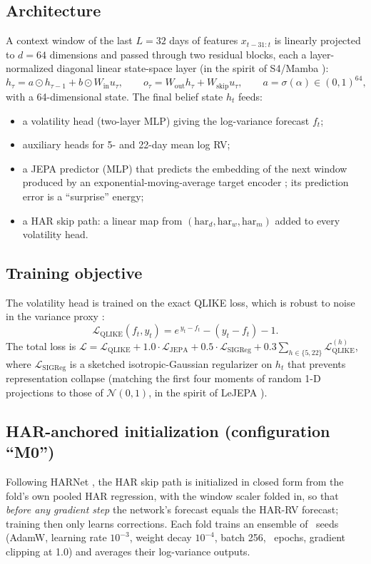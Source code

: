 \documentclass[11pt,a4paper]{article}
\begin{document}
\subsection{Architecture}
A context window of the last $L=32$ days of features $x_{t-31:t}$ is linearly projected to $d=64$
dimensions and passed through two residual blocks, each a layer-normalized diagonal linear
state-space layer (in the spirit of S4/Mamba \cite{gu2022s4,gu2023mamba}):
\begin{equation}
h_\tau = a \odot h_{\tau-1} + b \odot W_{\text{in}} u_\tau,\qquad
o_\tau = W_{\text{out}} h_\tau + W_{\text{skip}} u_\tau,\qquad a=\sigma(\alpha)\in(0,1)^{64},
\end{equation}
with a 64-dimensional state. The final belief state $h_t$ feeds:
\begin{itemize}
\item a volatility head (two-layer MLP) giving the log-variance forecast $f_t$;
\item auxiliary heads for 5- and 22-day mean log RV;
\item a JEPA predictor (MLP) that predicts the embedding of the next window produced by an
exponential-moving-average target encoder \cite{assran2023ijepa}; its prediction error is a ``surprise''
energy;
\item a HAR skip path: a linear map from $(\text{har}_d,\text{har}_w,\text{har}_m)$ added to every
volatility head.
\end{itemize}

\subsection{Training objective}
The volatility head is trained on the exact QLIKE loss, which is robust to noise in the variance proxy
\cite{patton2011}:
\begin{equation}
\mathcal{L}_{\text{QLIKE}}(f_t, y_t) = e^{\,y_t - f_t} - (y_t - f_t) - 1 .
\end{equation}
The total loss is $\mathcal{L} = \mathcal{L}_{\text{QLIKE}} + 1.0\cdot\mathcal{L}_{\text{JEPA}} +
0.5\cdot\mathcal{L}_{\text{SIGReg}} + 0.3\sum_{h\in\{5,22\}}\mathcal{L}^{(h)}_{\text{QLIKE}}$, where
$\mathcal{L}_{\text{SIGReg}}$ is a sketched isotropic-Gaussian regularizer on $h_t$ that prevents
representation collapse (matching the first four moments of random 1-D projections to those of
$\mathcal{N}(0,1)$, in the spirit of LeJEPA \cite{balestriero2025lejepa}).

\subsection{HAR-anchored initialization (configuration ``M0'')}
Following HARNet \cite{reisenhofer2022harnet}, the HAR skip path is initialized in closed form from the
fold's own pooled HAR regression, with the window scaler folded in, so that \emph{before any gradient
step} the network's forecast equals the HAR-RV forecast; training then only learns corrections.
Each fold trains an ensemble of \Seeds\ seeds (AdamW, learning rate $10^{-3}$, weight decay $10^{-4}$,
batch 256, \Epochs\ epochs, gradient clipping at 1.0) and averages their log-variance outputs.
\end{document}
